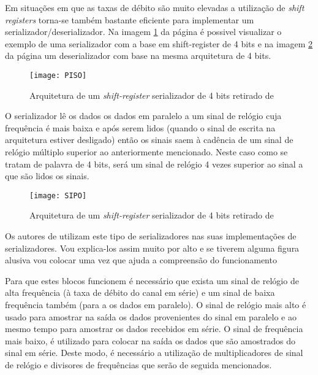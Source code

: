 Em situações em que as taxas de débito são muito elevadas a utilização de \textit{shift registers} torna-se também bastante eficiente para implementar um serializador/deserializador. Na imagem \ref{fig:piso} da página \pageref{fig:piso} é possivel visualizar o exemplo de uma serializador com a base em shift-register de 4 bits e na imagem \ref{fig:sipo} da página \pageref{fig:piso} um deserializador com base na mesma arquitetura de 4 bits.

	\begin{figure}[h!]
	\begin{center}
		\leavevmode
		\texttt{[image: PISO]}
		\caption{Arquitetura de um \textit{shift-register} serializador de 4 bits retirado de \cite{R034}}
		\label{fig:piso}
	\end{center}
\end{figure}

O serializador lê os dados os dados em paralelo a um sinal de relógio cuja frequência é mais baixa e após serem lidos (quando o sinal de escrita na arquitetura estiver desligado) então os sinais saem à cadência de um sinal de relógio múltiplo superior ao anteriormente mencionado. Neste caso como se tratam de palavra de 4 bits, será um sinal de relógio 4 vezes superior ao sinal a que são lidos os sinais.

	\begin{figure}[h!]
	\begin{center}
		\leavevmode
		\texttt{[image: SIPO]}
		\caption{Arquitetura de um \textit{shift-register} serializador de 4 bits retirado de \cite{R034}}
		\label{fig:sipo}
	\end{center}
\end{figure}



Os autores de \cite{R033} utilizam este tipo de serializadores nas suas implementações de serializadores. Vou explica-los assim muito por alto e se tiverem alguma figura alusiva vou colocar uma vez que ajuda a compreensão do funcionamento


Para que estes blocos funcionem é necessário que exista um sinal de relógio de alta frequência (à taxa de débito do canal em série) e um sinal de baixa frequência também (para a os dados em paralelo). O sinal de relógio mais alto é usado para amostrar na saída os dados provenientes do sinal em paralelo e ao mesmo tempo para amostrar os dados recebidos em série. O sinal de frequência mais baixo, é utilizado para colocar na saída os dados que são amostrados do sinal em série. Deste modo, é necessário a utilização de multiplicadores de sinal de relógio e divisores de frequências que serão de seguida mencionados.
	

